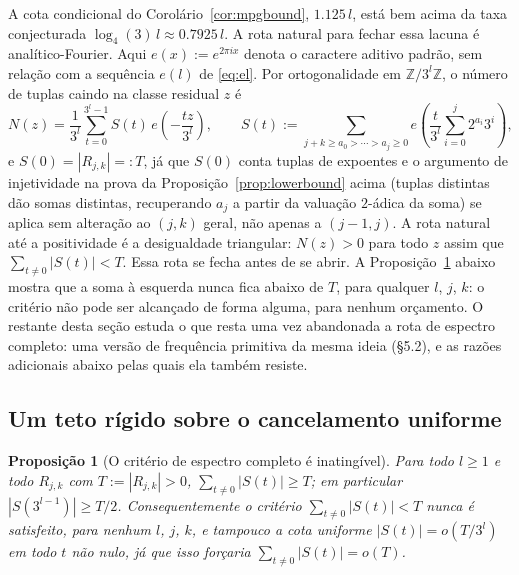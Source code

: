 \documentclass[11pt]{amsart}
\theoremstyle{plain}
\newtheorem{proposition}[theorem]{Proposi\c{c}\~ao}
\theoremstyle{definition}
\theoremstyle{remark}
\newcommand{\Z}{\mathbb{Z}}
\begin{document}
A cota condicional do Corolário~\ref{cor:mpgbound}, $1.125\,l$, está bem acima da taxa conjecturada
$\log_4(3)\,l \approx 0.7925\,l$. A rota natural para fechar essa lacuna é analítico-Fourier. Aqui
$e(x):=e^{2\pi ix}$ denota o caractere aditivo padrão, sem relação com a sequência $e(l)$ de
\eqref{eq:el}. Por ortogonalidade em $\Z/3^l\Z$, o número de tuplas caindo na classe residual $z$ é
\begin{equation}
\label{eq:Nz}
N(z) = \frac1{3^l}\sum_{t=0}^{3^l-1} S(t)\,e\!\left(-\frac{tz}{3^l}\right), \qquad
S(t) := \sum_{j+k\ge a_0>\cdots>a_j\ge0} e\!\left(\frac{t}{3^l}\sum_{i=0}^j 2^{a_i}3^i\right),
\end{equation}
e $S(0)=|R_{j,k}|=:T$, já que $S(0)$ conta tuplas de expoentes e o argumento de injetividade na
prova da Proposição~\ref{prop:lowerbound} acima (tuplas distintas dão somas distintas, recuperando
$a_j$ a partir da valuação $2$-ádica da soma) se aplica sem alteração ao $(j,k)$ geral, não apenas
a $(j-1,j)$. A rota natural até a positividade é a desigualdade triangular: $N(z)>0$ para todo $z$
assim que $\sum_{t\ne0}|S(t)| < T$. Essa rota se fecha antes de se abrir. A
Proposição~\ref{prop:sqrtceiling} abaixo mostra que a soma à esquerda nunca fica abaixo de $T$, para
qualquer $l$, $j$, $k$: o critério não pode ser alcançado de forma alguma, para nenhum orçamento. O
restante desta seção estuda o que resta uma vez abandonada a rota de espectro completo: uma versão
de frequência primitiva da mesma ideia (\S5.2), e as razões adicionais abaixo pelas quais ela também
resiste.

\subsection{Um teto rígido sobre o cancelamento uniforme}

\begin{proposition}[O critério de espectro completo é inatingível]
\label{prop:sqrtceiling}
Para todo $l\ge1$ e todo $R_{j,k}$ com $T:=|R_{j,k}|>0$, $\sum_{t\ne0}|S(t)| \ge T$; em particular
$|S(3^{l-1})|\ge T/2$. Consequentemente o critério $\sum_{t\ne0}|S(t)|<T$ nunca é satisfeito, para
nenhum $l$, $j$, $k$, e tampouco a cota uniforme $|S(t)|=o(T/3^l)$ em todo $t$ não nulo, já que
isso forçaria $\sum_{t\ne0}|S(t)|=o(T)$.
\end{proposition}
\end{document}
